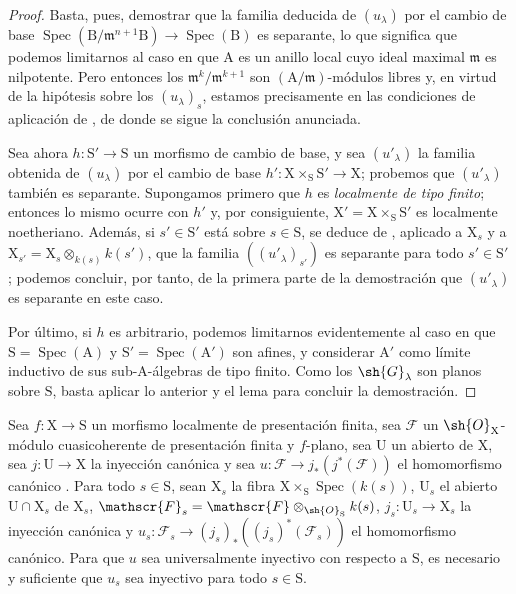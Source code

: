 \begin{proof}
Basta, pues, demostrar que la familia deducida de $(u_\lambda)$ por el cambio de base $\operatorname{Spec}(\mathrm{B}/\mathfrak{m}^{n+1}\mathrm{B})\to\operatorname{Spec}(\mathrm{B})$ es separante, lo que significa que podemos limitarnos al caso en que $\mathrm{A}$ es un anillo local cuyo ideal maximal $\mathfrak{m}$ es nilpotente.
Pero entonces los $\mathfrak{m}^k/\mathfrak{m}^{k+1}$ son $(\mathrm{A}/\mathfrak{m})$-módulos libres y, en virtud de la hipótesis sobre los $(u_\lambda)_s$, estamos precisamente en las condiciones de aplicación de , de donde se sigue la conclusión anunciada.

Sea ahora $h:\mathrm{S}'\to\mathrm{S}$ un morfismo de cambio de base, y sea $(u'_\lambda)$ la familia obtenida de $(u_\lambda)$ por el cambio de base $h':\mathrm{X}\times_\mathrm{S}\mathrm{S}'\to\mathrm{X}$; probemos que $(u'_\lambda)$ también es separante.
Supongamos primero que $h$ es \emph{localmente de tipo finito}; entonces lo mismo ocurre con $h'$ y, por consiguiente, $\mathrm{X}'=\mathrm{X}\times_\mathrm{S}\mathrm{S}'$ es localmente noetheriano. Además, si $s'\in\mathrm{S}'$ está sobre $s\in\mathrm{S}$, se deduce de , aplicado a $\mathrm{X}_s$ y a $\mathrm{X}_{s'}=\mathrm{X}_s\otimes_{k(s)}k(s')$, que la familia $((u'_\lambda)_{s'})$ es separante para todo $s'\in\mathrm{S}'$; podemos concluir, por tanto, de la primera parte de la demostración que $(u'_\lambda)$ es separante en este caso.

Por último, si $h$ es arbitrario, podemos limitarnos evidentemente al caso en que $\mathrm{S}=\operatorname{Spec}(\mathrm{A})$ y $\mathrm{S}'=\operatorname{Spec}(\mathrm{A}')$ son afines, y considerar $\mathrm{A}'$ como límite inductivo de sus sub-$\mathrm{A}$-álgebras de tipo finito.
Como los $\sh{G}_\lambda$ son planos sobre $\mathrm{S}$, basta aplicar lo anterior y el lema  para concluir la demostración.
\end{proof}

\begin{proposition}[11.9.17]
\label{IV.11.9.17}
Sea $f:\mathrm{X}\to\mathrm{S}$ un morfismo localmente de presentación finita, sea $\mathscr{F}$ un $\sh{O}_\mathrm{X}$-módulo cuasicoherente de presentación finita y $f$-plano, sea $\mathrm{U}$ un abierto de $\mathrm{X}$, sea $j:\mathrm{U}\to\mathrm{X}$ la inyección canónica y sea $u:\mathscr{F}\to j_*(j^*(\mathscr{F}))$ el homomorfismo canónico .
Para todo $s\in\mathrm{S}$, sean $\mathrm{X}_s$ la fibra $\mathrm{X}\times_\mathrm{S}\operatorname{Spec}(k(s))$, $\mathrm{U}_s$ el abierto $\mathrm{U}\cap\mathrm{X}_s$ de $\mathrm{X}_s$, $\mathscr{F}_s=\mathscr{F}\otimes_{\sh{O}_\mathrm{S}}k(s)$, $j_s:\mathrm{U}_s\to\mathrm{X}_s$ la inyección canónica y $u_s:\mathscr{F}_s\to(j_s)_*((j_s)^*(\mathscr{F}_s))$ el homomorfismo canónico.
Para que $u$ sea universalmente inyectivo con respecto a $\mathrm{S}$, es necesario y suficiente que $u_s$ sea inyectivo para todo $s\in\mathrm{S}$.
\end{proposition}

